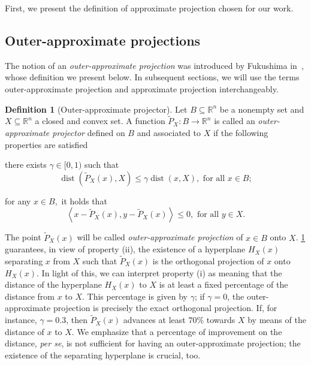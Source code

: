 \documentclass[smallextended,numbook,nospthms]{svjour3}
\theoremstyle{plain}
\theoremstyle{definition}
\newtheorem{definition}[theorem]{Definition}
\def\RR{\mathds R}
\DeclareMathOperator{\dist}{dist}
\newcommand{\scal}[2]{\left\langle{#1},{#2}  \right\rangle}
\begin{document}
First, we present the definition of approximate projection chosen for our work.

\subsection{Outer-approximate projections}
The notion of an \emph{outer-approximate projection} was introduced by Fukushima in~\cite[Lemma 4]{Fukushima:1983}, whose definition we present below. In subsequent sections, we will use the terms outer-approximate projection and approximate projection interchangeably. 
\begin{definition}[Outer-approximate projector]\label{def:approx proj}
	Let $B \subseteq \RR^{n}$ be a nonempty set and $X \subseteq \RR^{n}$ a closed and convex set. A function $\tilde{P}_{X}: B \rightarrow \RR^{n}$ is called an \emph{outer-approximate projector} defined on $B$ and associated to $X$ if the following properties are satisfied
	\begin{listi}
		\item there exists $\gamma \in [0,1)$ such that
		\begin{equation}
			\dist\left(\tilde{P}_{X}(x), X\right) \leq \gamma \dist(x, X), \text { for all } x \in B;
		\end{equation}
		\item  for any $x \in B,$ it holds that
		\begin{equation}
			\scal{x-\tilde{P}_{X}(x)}{y-\tilde{P}_{X}(x)} \leq 0, \text { for all } y \in X.
		\end{equation}
	\end{listi}
\end{definition}

The point $\tilde{P}_{X}(x)$ will be called \emph{outer-approximate projection} of $x \in B$ onto $X$. \cref{def:approx proj} guarantees, in view of property (ii), the existence of a hyperplane $H_{X}(x)$ separating $x$ from $X$ such that $\tilde{P}_{X}(x)$ is the orthogonal projection of $x$ onto $H_{X}(x)$. In light of this, we can interpret property (i) as meaning that the distance of the hyperplane $H_{X}(x)$ to $X$ is at least a fixed percentage of the distance from $x$ to $X$. This percentage is given by $\gamma$; if $\gamma=0$, the outer-approximate projection is precisely the exact orthogonal projection. If, for instance, $\gamma = 0.3$, then $\tilde{P}_{X}(x)$ advances at least $70 \%$ towards $X$ by means of the distance of $x$ to $X$. We emphasize that a percentage of improvement on the distance, \emph{per se}, is not sufficient for having an outer-approximate projection; the existence of the separating hyperplane is crucial, too.
\end{document}
